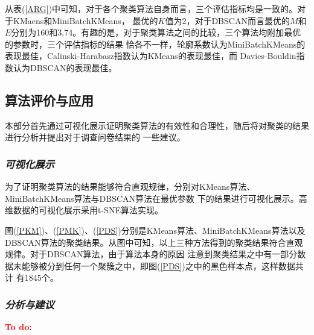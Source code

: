 \documentclass{acm_proc_article-sp}
\newcommand{\TODO}[1]{\textcolor{red}{\textbf{To do:#1}}}
\begin{document}
从表(\ref{ARG})中可知，对于各个聚类算法自身而言，三个评估指标均是一致的。对于KMaens和MiniBatchKMeans，
最优的$K$值为2，对于DBSCAN而言最优的$M$和$E$分别为160和3.74。有趣的是，对于聚类算法之间的比较，三个算法均附加最优的参数时，三个评估指标的结果
恰各不一样，轮廓系数认为MiniBatchKMeans的表现最佳，Calinski-Harabasz指数认为KMeans的表现最佳，而
Davies-Bouldin指数认为DBSCAN的表现最佳。




\subsection{\textsf{算法评价与应用}}
本部分首先通过可视化展示证明聚类算法的有效性和合理性，随后将对聚类的结果进行分析并提出对于调查问卷结果的
一些建议。

\subsubsection{\textit{可视化展示}}
为了证明聚类算法的结果能够符合直观规律，分别对KMeans算法、MiniBatchKMeans算法与DBSCAN算法在最优参数
下的结果进行可视化展示。高维数据的可视化展示采用t-SNE算法实现。



图(\ref{PKM})、(\ref{PMK})、(\ref{PDS})分别是KMeans算法、MiniBatchKMeans算法以及
DBSCAN算法的聚类结果。从图中可知，以上三种方法得到的聚类结果符合直观规律。对于DBSCAN算法，由于算法本身的原因
注意到聚类结果之中有一部分数据未能够被分到任何一个聚簇之中，即图(\ref{PDS})之中的黑色样本点，这样数据共计
有1845个。

\subsubsection{\textit{分析与建议}}
\TODO{}


%
%
\newpage
\appendix
\end{document}
